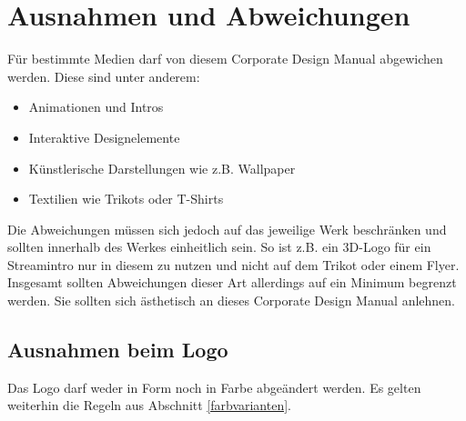 \documentclass{article}
\begin{document}
\cleardoublepage
\section{Ausnahmen und Abweichungen}

Für bestimmte Medien darf von diesem Corporate Design Manual abgewichen werden.
Diese sind unter anderem:

\begin{itemize}
\item Animationen und Intros
\item Interaktive Designelemente
\item Künstlerische Darstellungen wie z.B. Wallpaper
\item Textilien wie Trikots oder T-Shirts
\end{itemize}

Die Abweichungen müssen sich jedoch auf das jeweilige Werk beschränken und sollten innerhalb des Werkes einheitlich sein.
So ist z.B. ein 3D-Logo für ein Streamintro nur in diesem zu nutzen und nicht auf dem Trikot oder einem Flyer.
Insgesamt sollten Abweichungen dieser Art allerdings auf ein Minimum begrenzt werden. Sie sollten sich ästhetisch an dieses Corporate Design Manual anlehnen.

\subsection{Ausnahmen beim Logo}
Das Logo darf weder in Form noch in Farbe abgeändert werden. Es gelten weiterhin die Regeln aus Abschnitt \ref{farbvarianten}.
\end{document}
